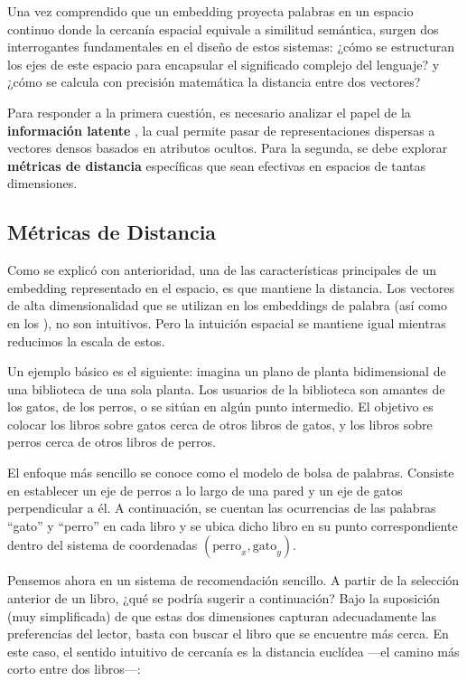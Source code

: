 Una vez comprendido que un embedding proyecta palabras en un espacio continuo donde la cercanía espacial equivale a similitud semántica, surgen dos interrogantes fundamentales en el diseño de estos sistemas: ¿cómo se estructuran los ejes de este espacio para encapsular el significado complejo del lenguaje? y ¿cómo se calcula con precisión matemática la distancia entre dos vectores?

Para responder a la primera cuestión, es necesario analizar el papel de la \textbf{información latente} \cite{henner_intuitive_embeddings_2023}, la cual permite pasar de representaciones dispersas a vectores densos basados en atributos ocultos. Para la segunda, se debe explorar \textbf{métricas de distancia} específicas que sean efectivas en espacios de tantas dimensiones.

\subsection{Métricas de Distancia}

Como se explicó con anterioridad, una de las características principales de un embedding representado en el espacio, es que mantiene la distancia. Los vectores de alta dimensionalidad que se utilizan en los embeddings de palabra (así como en los ), no son intuitivos. Pero la intuición espacial se mantiene igual mientras reducimos la escala de estos.

Un ejemplo básico es el siguiente: imagina un plano de planta bidimensional de una biblioteca de una sola planta. Los usuarios de la biblioteca son amantes de los gatos, de los perros, o se sitúan en algún punto intermedio. El objetivo es colocar los libros sobre gatos cerca de otros libros de gatos, y los libros sobre perros cerca de otros libros de perros.

El enfoque más sencillo se conoce como el modelo de bolsa de palabras. Consiste en establecer un eje de perros a lo largo de una pared y un eje de gatos perpendicular a él. A continuación, se cuentan las ocurrencias de las palabras ``gato'' y ``perro'' en cada libro y se ubica dicho libro en su punto correspondiente dentro del sistema de coordenadas $(\text{perro}_x, \text{gato}_y)$.

Pensemos ahora en un sistema de recomendación sencillo. A partir de la selección anterior de un libro, ¿qué se podría sugerir a continuación? Bajo la suposición (muy simplificada) de que estas dos dimensiones capturan adecuadamente las preferencias del lector, basta con buscar el libro que se encuentre más cerca. En este caso, el sentido intuitivo de cercanía es la distancia euclídea —el camino más corto entre dos libros—:

